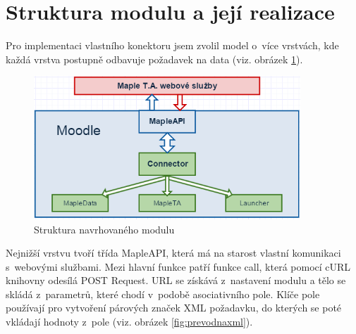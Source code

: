 \documentclass[
print,
  11pt,
  table,   
  nolof,    
  nolot,
  oneside,
  draft
]{fithesis3}
\begin{document}
	\section{Struktura modulu a její realizace}
Pro implementaci vlastního konektoru jsem zvolil model o~více vrstvách, kde každá vrstva postupně odbavuje požadavek na data (viz. obrázek \ref{fig:strukturamodulu}).
		\begin{figure}[htb]
		  \begin{center}
		    \includegraphics[width=100mm]{images/struktura_modulu.png}
		   \end{center}
		  \caption{Struktura navrhovaného modulu}
		  \label{fig:strukturamodulu}
		\end{figure}
Nejnižší vrstvu tvoří třída MapleAPI, která má na starost vlastní komunikaci s~webovými službami. Mezi hlavní funkce patří funkce call, která pomocí cURL knihovny odesílá POST Request. URL se získává z~nastavení modulu a tělo se skládá z~parametrů, které chodí v~podobě asociativního pole. Klíče pole používají pro vytvoření párových značek XML požadavku, do kterých se poté vkládají hodnoty z~pole (viz. obrázek \ref{fig:prevodnaxml}).
\end{document}

